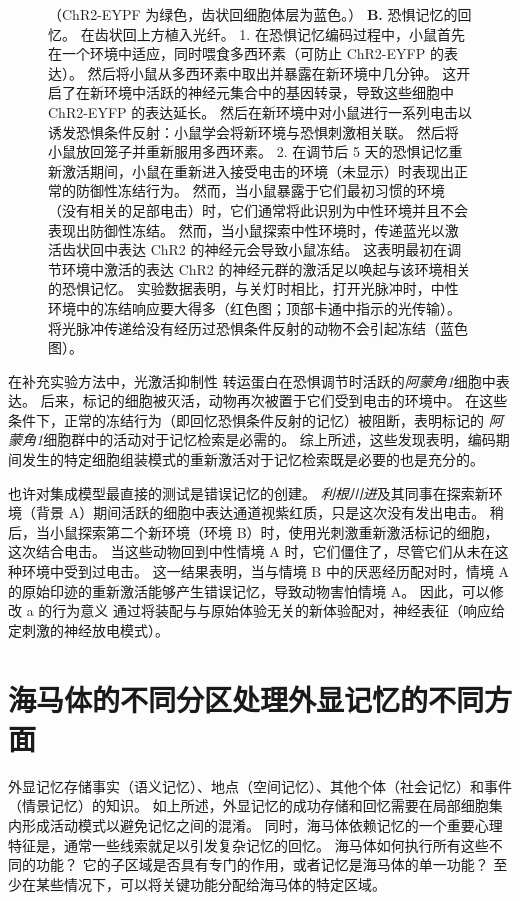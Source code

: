 \begin{figure}[htbp]
{		（ChR2-EYPF 为绿色，齿状回细胞体层为蓝色。） 
		\textbf{B.} 恐惧记忆的回忆。 在齿状回上方植入光纤。
		1. 在恐惧记忆编码过程中，小鼠首先在一个环境中适应，同时喂食多西环素（可防止 ChR2-EYFP 的表达）。
		然后将小鼠从多西环素中取出并暴露在新环境中几分钟。
		这开启了在新环境中活跃的神经元集合中的基因转录，导致这些细胞中 ChR2-EYFP 的表达延长。
		然后在新环境中对小鼠进行一系列电击以诱发恐惧条件反射：小鼠学会将新环境与恐惧刺激相关联。
		然后将小鼠放回笼子并重新服用多西环素。
		2. 在调节后 5 天的恐惧记忆重新激活期间，小鼠在重新进入接受电击的环境（未显示）时表现出正常的防御性冻结行为。
		然而，当小鼠暴露于它们最初习惯的环境（没有相关的足部电击）时，它们通常将此识别为中性环境并且不会表现出防御性冻结。
		然而，当小鼠探索中性环境时，传递蓝光以激活齿状回中表达 ChR2 的神经元会导致小鼠冻结。
		这表明最初在调节环境中激活的表达 ChR2 的神经元群的激活足以唤起与该环境相关的恐惧记忆。
		实验数据表明，与关灯时相比，打开光脉冲时，中性环境中的冻结响应要大得多（红色图；顶部卡通中指示的光传输）。
		将光脉冲传递给没有经历过恐惧条件反射的动物不会引起冻结（蓝色图）。}
	\label{fig:54_11}
\end{figure}


在补充实验方法中，光激活抑制性  转运蛋白在恐惧调节时活跃的\textit{阿蒙角1}细胞中表达。
后来，标记的细胞被灭活，动物再次被置于它们受到电击的环境中。
在这些条件下，正常的冻结行为（即回忆恐惧条件反射的记忆）被阻断，表明标记的 \textit{阿蒙角1}细胞群中的活动对于记忆检索是必需的。
综上所述，这些发现表明，编码期间发生的特定细胞组装模式的重新激活对于记忆检索既是必要的也是充分的。


也许对集成模型最直接的测试是错误记忆的创建。
\textit{利根川进}及其同事在探索新环境（背景 A）期间活跃的细胞中表达通道视紫红质，只是这次没有发出电击。
稍后，当小鼠探索第二个新环境（环境 B）时，使用光刺激重新激活标记的细胞，这次结合电击。
当这些动物回到中性情境 A 时，它们僵住了，尽管它们从未在这种环境中受到过电击。
这一结果表明，当与情境 B 中的厌恶经历配对时，情境 A 的原始印迹的重新激活能够产生错误记忆，导致动物害怕情境 A。
因此，可以修改 a 的行为意义 通过将装配与与原始体验无关的新体验配对，神经表征（响应给定刺激的神经放电模式）。



\section{海马体的不同分区处理外显记忆的不同方面}

外显记忆存储事实（语义记忆）、地点（空间记忆）、其他个体（社会记忆）和事件（情景记忆）的知识。
如上所述，外显记忆的成功存储和回忆需要在局部细胞集内形成活动模式以避免记忆之间的混淆。
同时，海马体依赖记忆的一个重要心理特征是，通常一些线索就足以引发复杂记忆的回忆。
海马体如何执行所有这些不同的功能？
它的子区域是否具有专门的作用，或者记忆是海马体的单一功能？
至少在某些情况下，可以将关键功能分配给海马体的特定区域。



